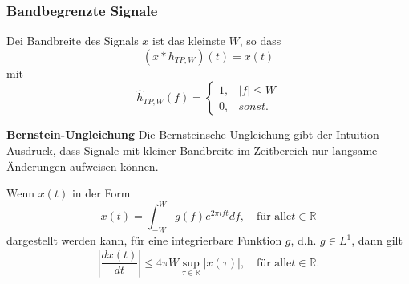 \subsubsection{Bandbegrenzte Signale}
Dei Bandbreite des Signals $x$ ist das kleinste $W$, so dass
\begin{equation*}
    (x*h_{TP,W})(t)=x(t)
\end{equation*}
mit
\begin{equation*}
    \hat{h}_{TP,W}(f)=
    \begin{cases}
        1, & |f| \leq W \\
        0, & sonst.
    \end{cases}
\end{equation*}

\textbf{Bernstein-Ungleichung}
Die Bernsteinsche Ungleichung gibt der Intuition Ausdruck, dass Signale mit kleiner
Bandbreite im Zeitbereich nur langsame Änderungen aufweisen können.

Wenn $x(t)$ in der Form
\begin{equation*}
    x(t)=\int_{-W}^{W}g(f)e^{2\pi ift}df,\quad\text{für alle}t\in\mathbb{R}
\end{equation*}
dargestellt werden kann, für eine integrierbare Funktion $g$, d.h. $g \in L^1$, dann gilt
\begin{equation*}
    \left|\frac{dx(t)}{dt}\right|\leq4\pi W\sup_{\tau\in\mathbb{R}}|x(\tau)|,\quad\text{für alle}t\in\mathbb{R}.
\end{equation*}